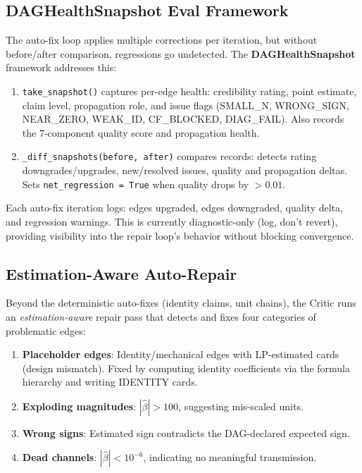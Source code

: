 \documentclass{article}
\begin{document}
\subsection{DAGHealthSnapshot Eval Framework}
\label{sec:critic-eval}

The auto-fix loop applies multiple corrections per iteration, but without before/after comparison, regressions go undetected. The \textbf{DAGHealthSnapshot} framework addresses this:

\begin{enumerate}[leftmargin=*, itemsep=1pt]
    \item \texttt{take\_snapshot()} captures per-edge health: credibility rating, point estimate, claim level, propagation role, and issue flags (SMALL\_N, WRONG\_SIGN, NEAR\_ZERO, WEAK\_ID, CF\_BLOCKED, DIAG\_FAIL). Also records the 7-component quality score and propagation health.
    \item \texttt{\_diff\_snapshots(before, after)} compares records: detects rating downgrades/upgrades, new/resolved issues, quality and propagation deltas. Sets \texttt{net\_regression = True} when quality drops by $>0.01$.
\end{enumerate}

Each auto-fix iteration logs: edges upgraded, edges downgraded, quality delta, and regression warnings. This is currently diagnostic-only (log, don't revert), providing visibility into the repair loop's behavior without blocking convergence.

\subsection{Estimation-Aware Auto-Repair}
\label{sec:critic-autofix}

Beyond the deterministic auto-fixes (identity claims, unit chains), the Critic runs an \emph{estimation-aware} repair pass that detects and fixes four categories of problematic edges:

\begin{enumerate}[leftmargin=*, itemsep=1pt]
    \item \textbf{Placeholder edges}: Identity/mechanical edges with LP-estimated cards (design mismatch). Fixed by computing identity coefficients via the formula hierarchy and writing IDENTITY cards.
    \item \textbf{Exploding magnitudes}: $|\hat{\beta}| > 100$, suggesting mis-scaled units.
    \item \textbf{Wrong signs}: Estimated sign contradicts the DAG-declared expected sign.
    \item \textbf{Dead channels}: $|\hat{\beta}| < 10^{-6}$, indicating no meaningful transmission.
\end{enumerate}
\end{document}
